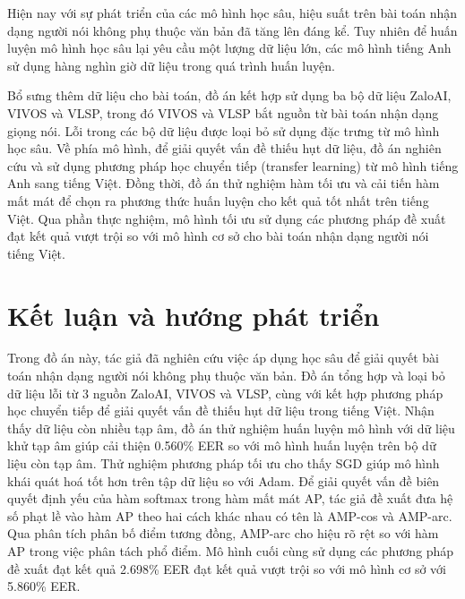 \documentclass[a4paper, 13pt, oneside]{report}
\begin{document}
Hiện nay với sự phát triển của các mô hình học sâu, hiệu suất trên bài toán nhận dạng người nói không phụ thuộc văn bản đã tăng lên đáng kể. Tuy nhiên để huấn luyện mô hình học sâu lại yêu cầu một lượng dữ liệu lớn, các mô hình tiếng Anh sử dụng hàng nghìn giờ dữ liệu trong quá trình huấn luyện.

Bổ sưng thêm dữ liệu cho bài toán, đồ án kết hợp sử dụng ba bộ dữ liệu ZaloAI, VIVOS và VLSP, trong đó VIVOS và VLSP bắt nguồn từ bài toán nhận dạng giọng nói. Lỗi trong các bộ dữ liệu được loại bỏ sử dụng đặc trưng từ mô hình học sâu. Về phía mô hình, để giải quyết vấn đề thiếu hụt dữ liệu, đồ án nghiên cứu và sử dụng phương pháp học chuyển tiếp (transfer learning) từ mô hình tiếng Anh sang tiếng Việt. Đồng thời, đồ án thử nghiệm hàm tối ưu và cải tiến hàm mất mát để chọn ra phương thức huấn luyện cho kết quả tốt nhất trên tiếng Việt. Qua phần thực nghiệm, mô hình tối ưu sử dụng các phương pháp đề xuất đạt kết quả vượt trội so với mô hình cơ sở cho bài toán nhận dạng người nói tiếng Việt.

\tableofcontents
\pagebreak
\listoffigures
\listoftables

\printglossary[type=\acronymtype,style=long, title=List of Abbreviations]
\printglossary
\pagebreak

\setcounter{page}{1}






\chapter{Kết luận và hướng phát triển}
Trong đồ án này, tác giả đã nghiên cứu việc áp dụng học sâu để giải quyết bài toán nhận dạng người nói không phụ thuộc văn bản. Đồ án tổng hợp và loại bỏ dữ liệu lỗi từ 3 nguồn ZaloAI, VIVOS và VLSP, cùng với kết hợp phương pháp học chuyển tiếp để giải quyết vấn đề thiếu hụt dữ liệu trong tiếng Việt. Nhận thấy dữ liệu còn nhiều tạp âm, đồ án thử nghiệm huấn luyện mô hình với dữ liệu khử tạp âm giúp cải thiện 0.560\% EER so với mô hình huấn luyện trên bộ dữ liệu còn tạp âm. Thử nghiệm phương pháp tối ưu cho thấy SGD giúp mô hình khái quát hoá tốt hơn trên tập dữ liệu so với Adam. Để giải quyết vấn đề biên quyết định yếu của hàm softmax trong hàm mất mát AP, tác giả đề xuất đưa hệ số phạt lề vào hàm AP theo hai cách khác nhau có tên là AMP-cos và AMP-arc. Qua phân tích phân bố điểm tương đồng, AMP-arc cho hiệu rõ rệt so với hàm AP trong việc phân tách phổ điểm. Mô hình cuối cùng sử dụng các phương pháp đề xuất đạt kết quả 2.698\% EER đạt kết quả vượt trội so với mô hình cơ sở với 5.860\% EER.
\end{document}
